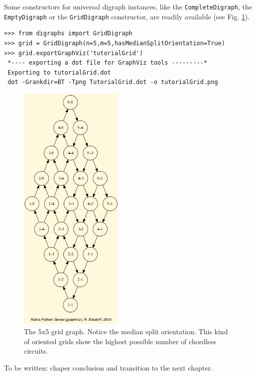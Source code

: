 Some constructors for universal digraph instances, like the \texttt{CompleteDigraph}, the \texttt{EmptyDigraph} or the \texttt{GridDigraph} constructor, are readily available (see Fig. \ref{fig:1.3}).
\begin{lstlisting}
>>> from digraphs import GridDigraph
>>> grid = GridDigraph(n=5,m=5,hasMedianSplitOrientation=True)
>>> grid.exportGraphViz('tutorialGrid')
 *---- exporting a dot file for GraphViz tools ---------*
 Exporting to tutorialGrid.dot
 dot -Grankdir=BT -Tpng TutorialGrid.dot -o tutorialGrid.png
\end{lstlisting}
\begin{figure}[h]
\sidecaption
\includegraphics[width=5cm]{Figures/tutorialGrid.png}
\caption{The 5x5 grid graph. Notice the median split orientation. This kind of oriented grids show the highest possible number of chordless circuits. }
\label{fig:1.3}       %
\end{figure}

To be written: chaper conclusion and transition to the next chapter.
